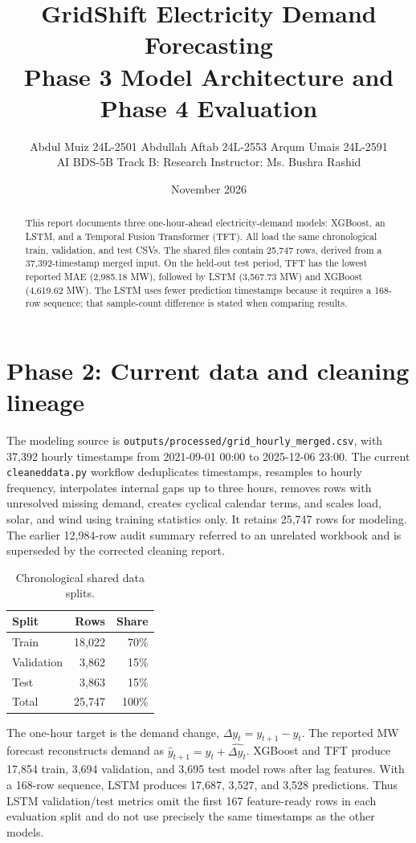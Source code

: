 \documentclass[11pt,a4paper]{article}
\title{\textbf{GridShift Electricity Demand Forecasting}\\\large Phase 3 Model Architecture and Phase 4 Evaluation}
\author{Abdul Muiz 24L-2501 \textbar{} Abdullah Aftab 24L-2553 \textbar{} Arqum Umais 24L-2591\\AI BDS-5B \textbar{} Track B: Research \textbar{} Instructor: Ms. Bushra Rashid}
\date{November 2026}
\begin{document}
\maketitle
\begin{abstract}
This report documents three one-hour-ahead electricity-demand models: XGBoost, an LSTM, and a Temporal Fusion Transformer (TFT). All load the same chronological train, validation, and test CSVs. The shared files contain 25,747 rows, derived from a 37,392-timestamp merged input. On the held-out test period, TFT has the lowest reported MAE (2,985.18 MW), followed by LSTM (3,567.73 MW) and XGBoost (4,619.62 MW). The LSTM uses fewer prediction timestamps because it requires a 168-row sequence; that sample-count difference is stated when comparing results.
\end{abstract}
\section{Phase 2: Current data and cleaning lineage}
The modeling source is \texttt{outputs/processed/grid\_hourly\_merged.csv}, with 37,392 hourly timestamps from 2021-09-01 00:00 to 2025-12-06 23:00. The current \texttt{cleaneddata.py} workflow deduplicates timestamps, resamples to hourly frequency, interpolates internal gaps up to three hours, removes rows with unresolved missing demand, creates cyclical calendar terms, and scales load, solar, and wind using training statistics only. It retains 25,747 rows for modeling. The earlier 12,984-row audit summary referred to an unrelated workbook and is superseded by the corrected cleaning report.

\begin{table}[H]\centering\caption{Chronological shared data splits.}\begin{tabular}{lrr}\toprule Split & Rows & Share \\\midrule Train & 18,022 & 70\% \\ Validation & 3,862 & 15\% \\ Test & 3,863 & 15\% \\ \midrule Total & 25,747 & 100\% \\\bottomrule\end{tabular}\end{table}

The one-hour target is the demand change, $\Delta y_t=y_{t+1}-y_t$. The reported MW forecast reconstructs demand as $\hat y_{t+1}=y_t+\widehat{\Delta y_t}$. XGBoost and TFT produce 17,854 train, 3,694 validation, and 3,695 test model rows after lag features. With a 168-row sequence, LSTM produces 17,687, 3,527, and 3,528 predictions. Thus LSTM validation/test metrics omit the first 167 feature-ready rows in each evaluation split and do not use precisely the same timestamps as the other models.
\end{document}
